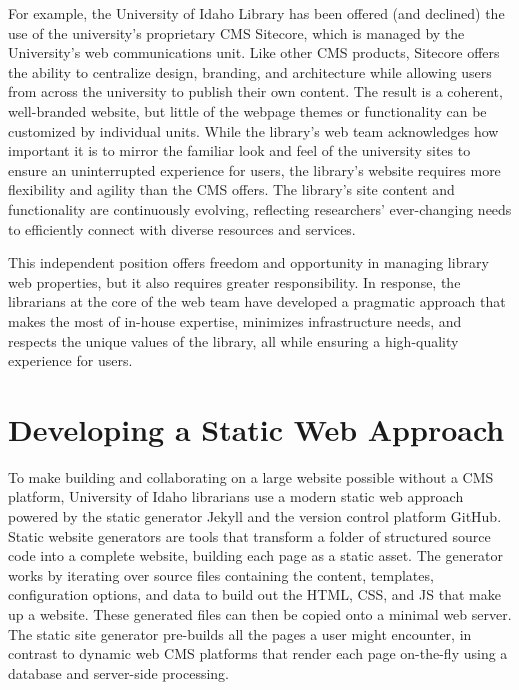 \documentclass{book}
\begin{document}
For example, the University of Idaho Library has been offered (and declined)
the use of the university's proprietary CMS Sitecore, which is managed by the
University's web communications unit. Like other CMS products, Sitecore offers
the ability to centralize design, branding, and architecture while allowing
users from across the university to publish their own content. The result is a
coherent, well-branded website, but little of the webpage themes or
functionality can be customized by individual units. While the library's web
team acknowledges how important it is to mirror the familiar look and feel of
the university sites to ensure an uninterrupted experience for users, the
library's website requires more flexibility and agility than the CMS offers.
The library's site content and functionality are continuously evolving,
reflecting researchers' ever-changing needs to efficiently connect with
diverse resources and services.

This independent position offers freedom and opportunity in managing library
web properties, but it also requires greater responsibility. In response, the
librarians at the core of the web team have developed a pragmatic approach
that makes the most of in-house expertise, minimizes infrastructure needs, and
respects the unique values of the library, all while ensuring a high-quality
experience for users.

\hypertarget{developing-a-static-web-approach}{%
\section{Developing a Static Web
Approach}\label{developing-a-static-web-approach}}

To make building and collaborating on a large website possible without a CMS
platform, University of Idaho librarians use a modern static web approach
powered by the static generator Jekyll and the version control platform
GitHub. Static website generators are tools that transform a folder of
structured source code into a complete website, building each page as a static
asset. The generator works by iterating over source files containing the
content, templates, configuration options, and data to build out the HTML,
CSS, and JS that make up a website. These generated files can then be copied
onto a minimal web server. The static site generator pre-builds all the pages
a user might encounter, in contrast to dynamic web CMS platforms that render
each page on-the-fly using a database and server-side processing.
\end{document}
